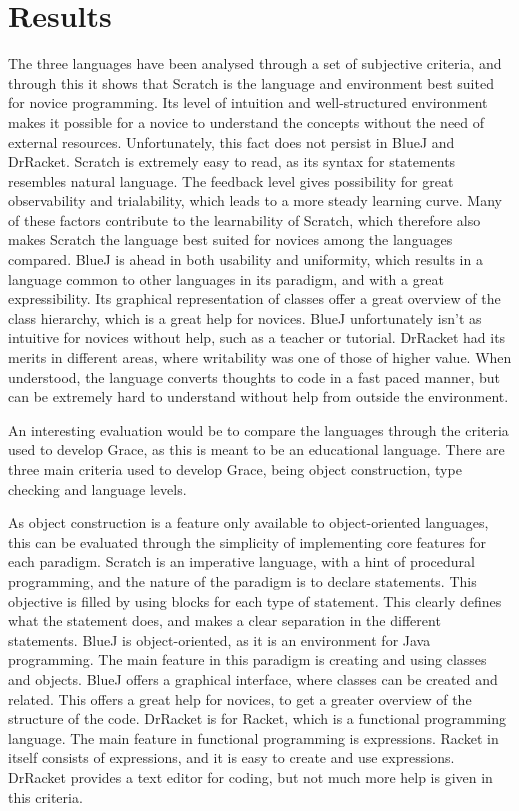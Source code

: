 \chapter{Results}
\label{chap:results}

The three languages have been analysed through a set of subjective criteria, and through this it shows that Scratch is the language and environment best suited for novice programming. Its level of intuition and well-structured environment makes it possible for a novice to understand the concepts without the need of external resources. Unfortunately, this fact does not persist in BlueJ and DrRacket. Scratch is extremely easy to read, as its syntax for statements resembles natural language. The feedback level gives possibility for great observability and trialability, which leads to a more steady learning curve. Many of these factors contribute to the learnability of Scratch, which therefore also makes Scratch the language best suited for novices among the languages compared. BlueJ is ahead in both usability and uniformity, which results in a language common to other languages in its paradigm, and with a great expressibility. Its graphical representation of classes offer a great overview of the class hierarchy, which is a great help for novices. BlueJ unfortunately isn't as intuitive for novices without help, such as a teacher or tutorial. DrRacket had its merits in different areas, where writability was one of those of higher value. When understood, the language converts thoughts to code in a fast paced manner, but can be extremely hard to understand without help from outside the environment.

An interesting evaluation would be to compare the languages through the criteria used to develop Grace\cite{grace}, as this is meant to be an educational language. There are three main criteria used to develop Grace, being object construction, type checking and language levels. 

As object construction is a feature only available to object-oriented languages, this can be evaluated through the simplicity of implementing core features for each paradigm. Scratch is an imperative language, with a hint of procedural programming, and the nature of the paradigm is to declare statements. This objective is filled by using blocks for each type of statement. This clearly defines what the statement does, and makes a clear separation in the different statements. BlueJ is object-oriented, as it is an environment for Java programming. The main feature in this paradigm is creating and using classes and objects. BlueJ offers a graphical interface, where classes can be created and related. This offers a great help for novices, to get a greater overview of the structure of the code. DrRacket is for Racket, which is a functional programming language. The main feature in functional programming is expressions. Racket in itself consists of expressions, and it is easy to create and use expressions. DrRacket provides a text editor for coding, but not much more help is given in this criteria.

